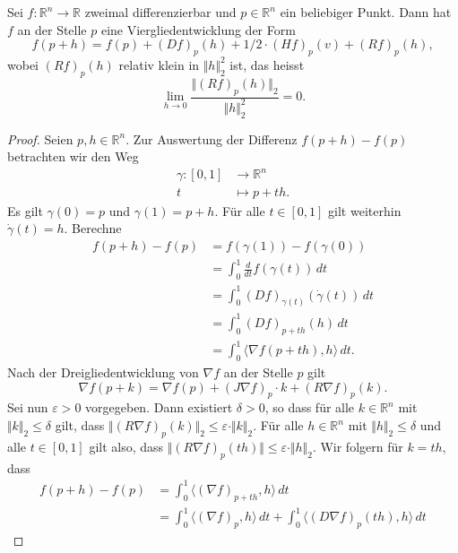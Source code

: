 \documentclass[../main.tex]{subfiles}
\begin{document}
\begin{proposition}[Viergliedentwicklung]
  Sei $f \colon \mathbb{R}^n \to \mathbb{R}$ zweimal differenzierbar
  und $p \in \mathbb{R}^n$ ein beliebiger Punkt.
  Dann hat $f$ an der Stelle $p$ eine Viergliedentwicklung
  der Form
  \[
    f(p + h) = f(p) + {(Df)}_p(h) + 1/2 \cdot {(Hf)}_p (v) + {(Rf)}_p(h),
  \]
  wobei ${(Rf)}_p(h)$ relativ klein in $\Vert h \Vert_2^2$ ist,
  das heisst
  \[
    \lim_{h \to 0} \frac{\Vert {(Rf)}_p(h) \Vert_2}{\Vert h \Vert_2^2} = 0.
  \]
\end{proposition}

\begin{proof}
  Seien $p, h \in \mathbb{R}^n$.
  Zur Auswertung der Differenz
  $f(p + h) - f(p)$ betrachten wir den
  Weg 
  \begin{align*}
    \gamma \colon [0, 1] & \to \mathbb{R}^n \\
    t & \mapsto p + th.
  \end{align*}
  Es gilt $\gamma(0) = p$ und $\gamma(1) = p + h$.
  Für alle $t \in [0, 1]$ gilt weiterhin $\dot \gamma(t) = h$.
  Berechne
  \begin{align*}
   f(p + h) - f(p)    
   &= f( \gamma(1))  -f(\gamma(0))  \\
   &= \int_{0}^{1} \frac{d}{dt} f(\gamma(t)) \, dt \\
   &= \int_{0}^{1} {(Df)}_{\gamma(t)}( \dot \gamma(t)) \, dt \\
   &= \int_{0}^{1} {(Df)}_{p + th}(h) \, dt \\
   &= \int_{0}^{1} \langle \nabla f(p + th), h \rangle \, dt.
  \end{align*}
  Nach der Dreigliedentwicklung von $\nabla f$ an der Stelle $p$ gilt
  \[
    \nabla f (p + k ) = \nabla f(p) + {(J \nabla f)}_p \cdot k +
    {(R \nabla f)}_p (k).
  \]
  Sei nun $\varepsilon > 0$ vorgegeben.
  Dann existiert $\delta > 0$,
  so dass für alle $k \in \mathbb{R}^n$ mit $\Vert k \Vert_2 \leq \delta$ 
  gilt, dass $\Vert {(R \nabla f)}_p(k) \Vert_2 \leq \varepsilon \cdot
  \Vert k \Vert_2$.
  Für alle $h \in \mathbb{R}^n$ mit $\Vert h \Vert_2 \leq \delta$ 
  und alle $t \in [0, 1]$ gilt also, dass
  $\Vert {(R \nabla f)}_p (th) \Vert \leq \varepsilon \cdot \Vert h \Vert_2$.
  Wir folgern für $k = th$, dass
  \begin{align*}
    f(p + h) - f(p)
    & = \int_{0}^{1} \langle {(\nabla f)}_{p + th}, h \rangle \, dt\\
    &= \int_{0}^{1} \langle {(\nabla f)}_p , h \rangle \, dt
    + \int_{0}^{1} \langle {(D \nabla f)}_p (th), h \rangle \, dt

\end{align*}
\end{proof}
\end{document}
